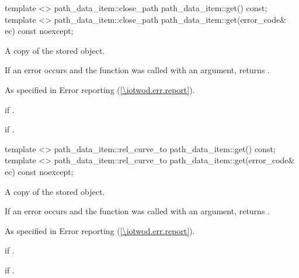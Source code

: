 \begin{itemdecl}
template <>
path_data_item::close_path path_data_item::get() const;
template <>
path_data_item::close_path path_data_item::get(error_code& ec) const noexcept;
\end{itemdecl}
\begin{itemdescr}
\pnum
\returns
A copy of the stored  object.

\pnum
If an error occurs and the function was called with an  argument, returns .

\pnum
\throws
As specified in Error reporting (\ref{\iotwod.err.report}).

\pnum
\errors
{} if .

\pnum
{} if .
\end{itemdescr}

\begin{itemdecl}
template <>
path_data_item::rel_curve_to path_data_item::get() const;
template <>
path_data_item::rel_curve_to path_data_item::get(error_code& ec) const noexcept;
\end{itemdecl}
\begin{itemdescr}
\pnum
\returns
A copy of the stored  object.

\pnum
If an error occurs and the function was called with an  argument, returns .

\pnum
\throws
As specified in Error reporting (\ref{\iotwod.err.report}).

\pnum
\errors
{} if .

\pnum
{} if .
\end{itemdescr}

